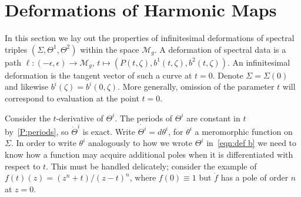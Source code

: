 \documentclass{article}
\begin{document}
\section{Deformations of Harmonic Maps}\label{sec:deformations}

In this section we lay out the properties of infinitesimal deformations of spectral triples $(\Sigma,\Theta^1,\Theta^2)$ within the space $\mathcal{M}_g$. A deformation of spectral data is a path $\ell:(-\epsilon,\epsilon) \to \mathcal{M}_g$, $t \mapsto (P(t,\zeta),b^1(t,\zeta),b^2(t,\zeta))$. An infinitesimal deformation is the tangent vector of such a curve at $t=0$.
Denote $\Sigma = \Sigma(0)$ and likewise $b^i(\zeta) = b^i(0,\zeta)$.
More generally, omission of the parameter $t$ will correspond to evaluation at the point $t=0$.

Consider the $t$-derivative of $\Theta^i$. The periods of $\Theta^i$ are constant in $t$ by~\ref{P:periods}, so $\dot{\Theta}^i$ is exact. Write $\dot{\Theta^i} = d\theta^i$, for $\theta^i$ a meromorphic function on $\Sigma$. In order to write $\theta^i$ analogously to how we wrote $\Theta^i$ in~\eqref{eqn:def b} we need to know how a function may acquire additional poles when it is differentiated with respect to $t$. This must be handled delicately; consider the example of $f(t)(z) = (z^n+t)/{(z-t)}^n$, where $f(0) \equiv 1$ but $\dot{f}$ has a pole of order $n$ at $z=0$.
\end{document}

